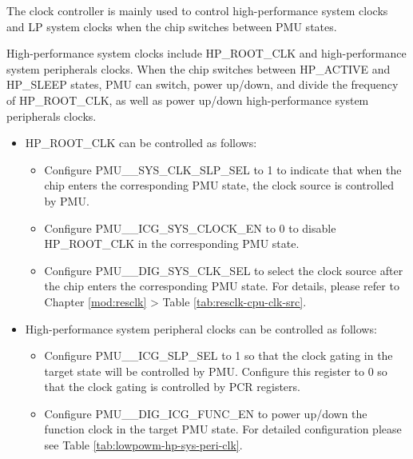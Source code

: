\documentclass[main\_\_EN.tex]{subfiles}
\begin{document}
The clock controller is mainly used to control high-performance system clocks and LP system clocks when the chip switches between PMU states.

High-performance system clocks include HP\_ROOT\_CLK and high-performance system peripherals clocks. When the chip switches between HP\_ACTIVE and HP\_SLEEP states, PMU can switch, power up/down, and divide the frequency of HP\_ROOT\_CLK, as well as power up/down high-performance system peripherals clocks.

\begin{itemize}

\item HP\_ROOT\_CLK can be controlled as follows:

    \begin{itemize}
    \item Configure PMU\_\_SYS\_CLK\_SLP\_SEL to 1 to indicate that when the chip enters the corresponding PMU state, the clock source is controlled by PMU.

    \item Configure PMU\_\_ICG\_SYS\_CLOCK\_EN to 0 to disable HP\_ROOT\_CLK in the corresponding PMU state.

    \item Configure PMU\_\_DIG\_SYS\_CLK\_SEL to select the clock source after the chip enters the corresponding PMU state. For details, please refer to Chapter \ref{mod:resclk} \textit{} > Table \ref{tab:resclk-cpu-clk-src}.
    \end{itemize}

\item High-performance system peripheral clocks can be controlled as follows:

    \begin{itemize}
    \item Configure PMU\_\_ICG\_SLP\_SEL to 1 so that the clock gating in the target state will be controlled by PMU. Configure this register to 0 so that the clock gating is controlled by PCR registers.

    \item Configure PMU\_\_DIG\_ICG\_FUNC\_EN to power up/down the function clock in the target PMU state. For detailed configuration please see Table \ref{tab:lowpowm-hp-sys-peri-clk}.


\end{itemize}
\end{itemize}
\end{document}
